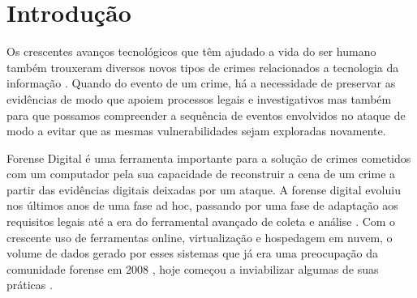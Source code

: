 \documentclass[
	12pt,				%
	openright,			%
	oneside,			%
	a4paper,			%
	english,			%
	french,				%
	spanish,			%
	brazil,				%
	]{abntex2}
\begin{document}
\frenchspacing 


\imprimircapa

\imprimirfolhaderosto


\tableofcontents
\cleardoublepage


\textual

\chapter{Introdução}

Os crescentes avanços tecnológicos que têm ajudado a vida do ser humano também trouxeram diversos novos tipos de crimes relacionados a tecnologia da informação \cite{cnbsp}.
Quando do evento de um crime, há a necessidade de preservar as evidências de modo que apoiem processos legais e investigativos mas também para que possamos compreender a sequência
de eventos envolvidos no ataque de modo a evitar que as mesmas vulnerabilidades sejam exploradas novamente.

\par

Forense Digital é uma ferramenta importante para a solução de crimes cometidos com um computador pela sua capacidade de reconstruir a cena de um crime a partir das evidências
digitais deixadas por um ataque. A forense digital evoluiu nos últimos anos de uma fase ad hoc, passando por uma fase de adaptação aos requisitos legais até a era do ferramental
avançado de coleta e análise \cite{Charters2009} . Com o crescente uso de ferramentas online, virtualização e hospedagem em nuvem, o volume de dados gerado por esses sistemas que já era uma preocupação
da comunidade forense em 2008 \cite{Simou2014}, hoje começou a inviabilizar algumas de suas práticas \cite{Sharma2012}.  
\end{document}

